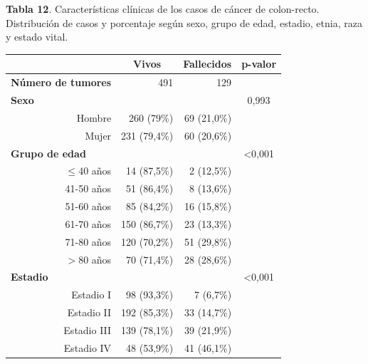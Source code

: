 \textbf{Tabla 12}. Características clínicas de los casos de cáncer de colon-recto. Distribución de casos y porcentaje según sexo, grupo de edad, estadio, etnia, raza y estado vital.

\begin{table}[H]
		\centering
	\begin{tabular}{rrrc}
		\cline{2-4}
		\multicolumn{1}{l}{}                           & \multicolumn{1}{c}{\textbf{Vivos}} & \multicolumn{1}{c}{\textbf{Fallecidos}} & \multicolumn{1}{c}{\textbf{p-valor}} \\ \hline
		\multicolumn{1}{l}{\textbf{Número de tumores}} & 491            & 129                 &                  \\ \hline
		\multicolumn{1}{l}{\textbf{Sexo}}              &                &                     & 0,993            \\
		Hombre                                         & 260 (79\%)     & 69 (21,0\%)           &                  \\
		Mujer                                          & 231 (79,4\%)   & 60 (20,6\%)         &                  \\ \hline
		\multicolumn{1}{l}{\textbf{Grupo de edad}}     &                &                     & \textless{}0,001 \\
		$\leq$40 años                                     & 14 (87,5\%)    & 2 (12,5\%)          &                  \\
		41-50 años                                     & 51 (86,4\%)    & 8 (13,6\%)          &                  \\
		51-60 años                                     & 85 (84,2\%)    & 16 (15,8\%)         &                  \\
		61-70 años                                     & 150 (86,7\%)   & 23 (13,3\%)         &                  \\
		71-80 años                                     & 120 (70,2\%)   & 51 (29,8\%)         &                  \\
		$>$80 años                                  & 70 (71,4\%)    & 28 (28,6\%)         &                  \\ \hline
		\multicolumn{1}{l}{\textbf{Estadio}}           &                &                     & \textless{}0,001 \\
		Estadio I                                      & 98 (93,3\%)    & 7 (6,7\%)           &                  \\
		Estadio II                                     & 192 (85,3\%)   & 33 (14,7\%)         &                  \\
		Estadio III                                    & 139 (78,1\%)   & 39 (21,9\%)         &                  \\
		Estadio IV                                     & 48 (53,9\%)    & 41 (46,1\%)         &                  \\ \hline
	\end{tabular}
\end{table}

